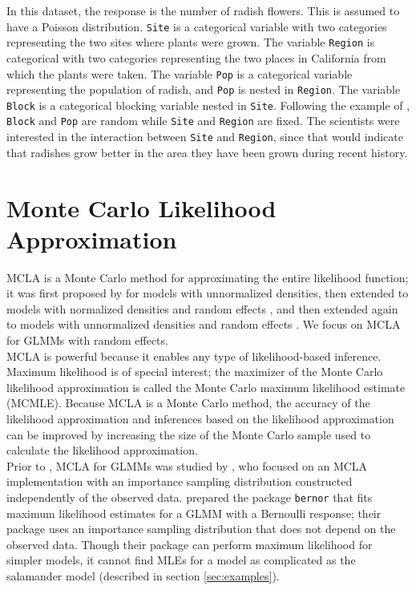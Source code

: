 \documentclass[article]{jss}
\begin{document}
In this dataset, the response is the number of radish flowers. This is assumed to have a Poisson distribution.  \texttt{Site} is a categorical variable with two categories representing the two sites where plants were grown. The variable \texttt{Region} is categorical with two categories representing the two places in California from which the plants were taken. The variable \texttt{Pop} is a categorical variable representing the population of radish, and \texttt{Pop} is nested in \texttt{Region}. The variable \texttt{Block} is a categorical blocking variable nested in \texttt{Site}.  Following the example of \citet{ridley:ellstrand:2010}, \texttt{Block} and \texttt{Pop} are random while \texttt{Site} and \texttt{Region} are fixed. The scientists were interested in  the interaction between \texttt{Site} and \texttt{Region}, since that would indicate that radishes grow better in the area they have been grown during recent history.




\section{Monte Carlo Likelihood Approximation}

MCLA is a  Monte Carlo method for approximating the entire likelihood function; it was first proposed by \citet{geyer:1990} for models with unnormalized densities, then extended to models with normalized densities and random effects \citep{thom:guo:1991}, and then extended again to models with unnormalized densities and random effects \citep{gelf:carl:1993}.
 We focus on  MCLA  for GLMMs with random effects.  \\

MCLA is powerful  because it enables any type of likelihood-based inference.  Maximum likelihood is of special interest; the maximizer of the Monte Carlo likelihood approximation is called the Monte Carlo maximum likelihood estimate (MCMLE). Because MCLA is a Monte Carlo method, the accuracy of the likelihood approximation and inferences based on the likelihood approximation  can be improved by increasing the size of the Monte Carlo sample used to calculate the likelihood approximation. \\


Prior to , MCLA for GLMMs was   studied by \citet{sung:geyer:2007}, who  focused on an MCLA implementation with an importance sampling distribution constructed independently of the observed data. \citet{sung:geyer:2007} prepared the  package \texttt{bernor} that  fits maximum likelihood estimates for a GLMM with a Bernoulli response; their package uses an importance sampling distribution that does not depend on the observed data. Though their package can perform maximum likelihood for simpler models,  it cannot find MLEs for a model as complicated as the salamander model (described in section \ref{sec:examples}).  \\
\end{document}
